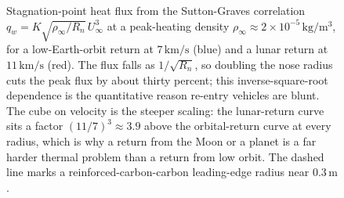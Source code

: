 \begin{figure}[htbp]
\centering
{}
\caption[Stagnation heat flux versus nose radius]{Stagnation-point heat
flux from the Sutton-Graves correlation $q_w=K\sqrt{\rho_\infty/R_n}\,
U_\infty^3$ at a peak-heating density $\rho_\infty\approx2\times10^{-5}\,
\si{\kilogram\per\meter\cubed}$, for a low-Earth-orbit return at
$7\,\si{\kilo\meter\per\second}$ (blue) and a lunar return at
$11\,\si{\kilo\meter\per\second}$ (red). The flux falls as
$1/\sqrt{R_n}$, so doubling the nose radius cuts the peak flux by about
thirty percent; this inverse-square-root dependence is the quantitative
reason re-entry vehicles are blunt. The cube on velocity is the steeper
scaling: the lunar-return curve sits a factor $(11/7)^3\approx3.9$ above
the orbital-return curve at every radius, which is why a return from the
Moon or a planet is a far harder thermal problem than a return from low
orbit. The dashed line marks a reinforced-carbon-carbon leading-edge
radius near $0.3\,\si{\meter}$.}
\label{fig:vol03ch13:heat-flux-radius}
\end{figure}
